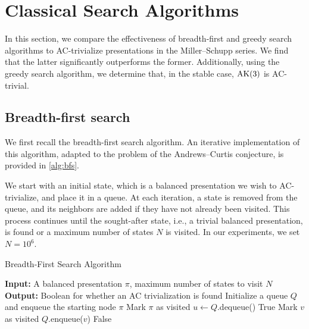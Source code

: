 
\section{Classical Search Algorithms}\label{sec:search}

In this section, we compare the effectiveness of breadth-first and greedy search algorithms to AC-trivialize presentations in the Miller--Schupp series.
We find that the latter significantly outperforms the former.
Additionally, using the greedy search algorithm, we determine that, in the stable case, $\text{AK}(3)$ is AC-trivial.

\subsection{Breadth-first search}

We first recall the breadth-first search algorithm.
An iterative implementation of this algorithm, adapted to the problem of the Andrews--Curtis conjecture, is provided in \autoref{alg:bfs}.

We start with an initial state, which is a balanced presentation we wish to AC-trivialize, and place it in a queue.
At each iteration, a state is removed from the queue, and its neighbors are added if they have not already been visited.
This process continues until the sought-after state, i.e., a trivial balanced presentation, is found or a maximum number of states $N$ is visited. In our experiments, we set $N = 10^6$.

\begin{algorithm}
	\caption{Breadth-First Search Algorithm}\label{alg:bfs}
	\begin{algorithmic}[1] %
		\State \textbf{Input:} A balanced presentation $\pi$, maximum number of states to visit $N$
		\State \textbf{Output:} Boolean for whether an AC trivialization is found
		\State Initialize a queue $Q$ and enqueue the starting node $\pi$
		\State Mark $\pi$ as visited
		\State $u \gets Q$.dequeue() 
		\State \Return True 
		\EndIf
		\State Mark $v$ as visited
		\State $Q$.enqueue($v$) 
		\EndIf
		\EndFor
		\EndWhile
		\State \Return False 
	\end{algorithmic}
\end{algorithm}

